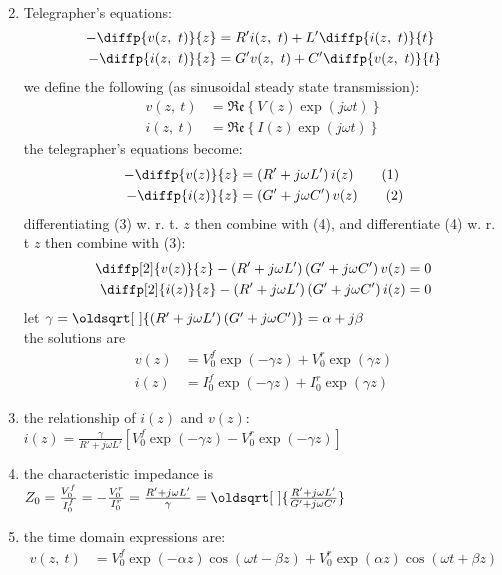 \documentclass[a4paper,11pt]{article}
\newcommand\numberthis{\addtocounter{equation}{1}\tag{\theequation}}
\renewcommand*{\sqrt}[2][\ ]{\oldsqrt[#1]{#2}}
\begin{document}
\begin{enumerate}
\begin{align*}
		\end{align*}
		\item Telegrapher's equations: 
		\begin{align*}
			-\diffp{v(z,~t)}{z} &=  R'i(z,~t) + L'\diffp{i(z,~t)}{t} \\
			-\diffp{i(z,~t)}{z} &=  G'v(z,~t) + C'\diffp{v(z,~t)}{t}
		\end{align*}
		we define the following (as sinusoidal steady state transmission):
		\begin{align*}
			v(z,~t) &= \mathfrak{Re}\left\{V(z)\exp\left(j\omega t\right)\right\} \\
			i(z,~t) &= \mathfrak{Re}\left\{I(z)\exp\left(j\omega t\right)\right\}
		\end{align*}
		the telegrapher's equations become: 
		\begin{align*}
			-\diffp{v(z)}{z} &= \left(R' + j\omega L'\right)i(z) \numberthis \\
			-\diffp{i(z)}{z} &= \left(G' + j\omega C'\right)v(z) \numberthis
		\end{align*}
		differentiating (3) w. r. t. $z$ then combine with (4), and differentiate (4) w. r. t $z$ then combine with (3):
		\begin{align*}
			\diffp[2]{v(z)}{z} - \left(R' + j\omega L'\right)\left(G' + j\omega C'\right)v(z) &= 0 \\
			\diffp[2]{i(z)}{z} - \left(R' + j\omega L'\right)\left(G' + j\omega C'\right)i(z) &= 0
		\end{align*}
		let $\gamma = \sqrt{\left(R' + j\omega L'\right)\left(G' + j\omega C'\right)} = \alpha + j\beta$ \\
		the solutions are
		\begin{align*}
			v(z) &= V_0^f\exp\left(-\gamma z\right) + V_0^r\exp\left(\gamma z\right) \\
			i(z) &= I_0^f\exp\left(-\gamma z\right) + I_0^r\exp\left(\gamma z\right)	
		\end{align*}
		\item the relationship of $i(z)$ and $v(z)$: $i(z) = \frac{\gamma}{R' + j\omega L'}\left[V_0^f\exp\left(-\gamma z\right) - V_0^r\exp\left(-\gamma z\right)\right]$
		\item the characteristic impedance is $Z_0 = \frac{V_0^f}{I_0^f} = -\frac{V_0^r}{I_0^r} = \frac{R' + j\omega L'}{\gamma} = \sqrt{\frac{R' + j\omega L'}{G' + j\omega C'}}$
		\item the time domain expressions are:
		\begin{align*}
			v(z,~t) &= V_0^f\exp\left(-\alpha z\right)\cos\left(\omega t -\beta z\right) + V_0^r\exp\left(\alpha z\right)\cos\left(\omega t +\beta z\right) \\

\end{align*}
\end{enumerate}
\end{document}
